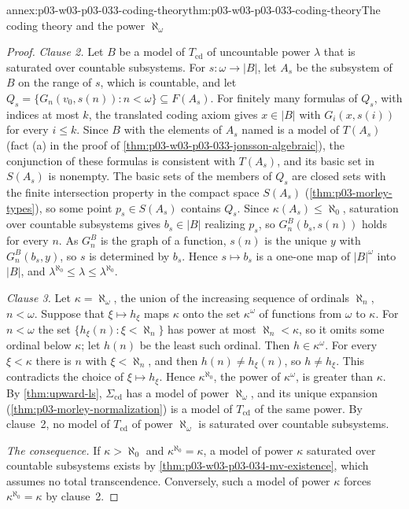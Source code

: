 \begin{annexitem}{annex:p03-w03-p03-033-coding-theory}{thm:p03-w03-p03-033-coding-theory}{The coding theory and the power \(\aleph_\omega\)}
\begin{proof}
\emph{Clause 2.} Let \(B\) be a model of \(T_{\mathrm{cd}}\) of uncountable
power \(\lambda\) that is saturated over countable subsystems. For
\(s:\omega\to|B|\), let \(A_s\) be the subsystem of \(B\) on the range of
\(s\), which is countable, and let
\(Q_s=\{G_n(v_0,s(n)):n<\omega\}\subseteq F(A_s)\). For finitely many
formulas of \(Q_s\), with indices at most \(k\), the translated coding
axiom gives \(x\in|B|\) with \(G_i(x,s(i))\) for every \(i\leq k\). Since
\(B\) with the elements of \(A_s\) named is a model of \(T(A_s)\) (fact (a)
in the proof of \cref{thm:p03-w03-p03-033-jonsson-algebraic}), the
conjunction of these formulas is consistent with \(T(A_s)\), and its
basic set in \(S(A_s)\) is nonempty. The basic sets of the members of
\(Q_s\) are closed sets with the finite intersection property in the
compact space \(S(A_s)\) (\cref{thm:p03-morley-types}), so some point
\(p_s\in S(A_s)\) contains \(Q_s\). Since \(\kappa(A_s)\leq\aleph_0\),
saturation over countable subsystems gives \(b_s\in|B|\) realizing
\(p_s\), so \(G_n^B(b_s,s(n))\) holds for every \(n\). As \(G_n^B\) is the
graph of a function, \(s(n)\) is the unique \(y\) with \(G_n^B(b_s,y)\),
so \(s\) is determined by \(b_s\). Hence \(s\mapsto b_s\) is a one-one map
of \(|B|^\omega\) into \(|B|\), and
\(\lambda^{\aleph_0}\leq\lambda\leq\lambda^{\aleph_0}\).

\emph{Clause 3.} Let \(\kappa=\aleph_\omega\), the union of the increasing
sequence of ordinals \(\aleph_n\), \(n<\omega\). Suppose that
\(\xi\mapsto h_\xi\) maps \(\kappa\) onto the set \(\kappa^\omega\) of
functions from \(\omega\) to \(\kappa\). For \(n<\omega\) the set
\(\{h_\xi(n):\xi<\aleph_n\}\) has power at most \(\aleph_n<\kappa\), so
it omits some ordinal below \(\kappa\); let \(h(n)\) be the least such
ordinal. Then \(h\in\kappa^\omega\). For every \(\xi<\kappa\) there is
\(n\) with \(\xi<\aleph_n\), and then \(h(n)\neq h_\xi(n)\), so
\(h\neq h_\xi\). This contradicts the choice of \(\xi\mapsto h_\xi\). Hence
\(\kappa^{\aleph_0}\), the power of \(\kappa^\omega\), is greater than
\(\kappa\). By \cref{thm:upward-ls}, \(\Sigma_{\mathrm{cd}}\) has a
model of power \(\aleph_\omega\), and its unique expansion
(\cref{thm:p03-morley-normalization}) is a model of \(T_{\mathrm{cd}}\) of
the same power. By clause~2, no model of \(T_{\mathrm{cd}}\) of power
\(\aleph_\omega\) is saturated over countable subsystems.

\emph{The consequence.} If \(\kappa>\aleph_0\) and
\(\kappa^{\aleph_0}=\kappa\), a model of power \(\kappa\) saturated over
countable subsystems exists by \cref{thm:p03-w03-p03-034-mv-existence},
which assumes no total transcendence. Conversely, such a model of power
\(\kappa\) forces \(\kappa^{\aleph_0}=\kappa\) by clause~2.
\end{proof}
\end{annexitem}
